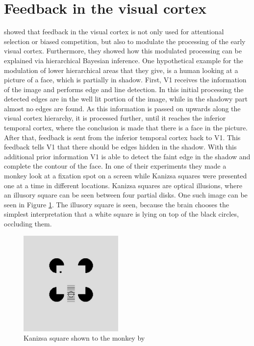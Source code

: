 \section{Feedback in the visual cortex}
\label{section:feedbackInVisualCortex}
\citet{HierachicalBayesVisualCortex} showed that feedback in the visual cortex is not only used for attentional selection or biased competition, but also to modulate the processing of the early visual cortex. Furthermore, they showed how this modulated processing can be explained via hierarchical Bayesian inference. One hypothetical example for the modulation of lower hierarchical areas that they give, is a human looking at a picture of a face, which is partially in shadow. First, V1 receives the information of the image and performs edge and line detection. In this initial processing the detected edges are in the well lit portion of the image, while in the shadowy part almost no edges are found. As this information is passed on upwards along the visual cortex hierarchy, it is processed further, until it reaches the inferior temporal cortex, where the conclusion is made that there is a face in the picture. After that, feedback is sent from the inferior temporal cortex back to V1. This feedback tells V1 that there should be edges hidden in the shadow. With this additional prior information V1 is able to detect the faint edge in the shadow and complete the contour of the face. 
In one of their experiments they made a monkey look at a fixation spot on a screen while Kanizsa squares were presented one at a time in different locations. Kanizsa squares are optical illusions, where an illusory square can be seen between four partial disks. One such image can be seen in Figure \ref{fig:KanizsaSquare}. The illusory square is seen, because the brain chooses the simplest interpretation that a white square is lying on top of the black circles, occluding them.

\begin{figure}
\centering
  \includegraphics[width=0.5\linewidth]{figures/kanizsaSquare.PNG}
  \caption{Kanizsa square shown to the monkey by \citet{HierachicalBayesVisualCortex}}
  \label{fig:KanizsaSquare}
\end{figure}

